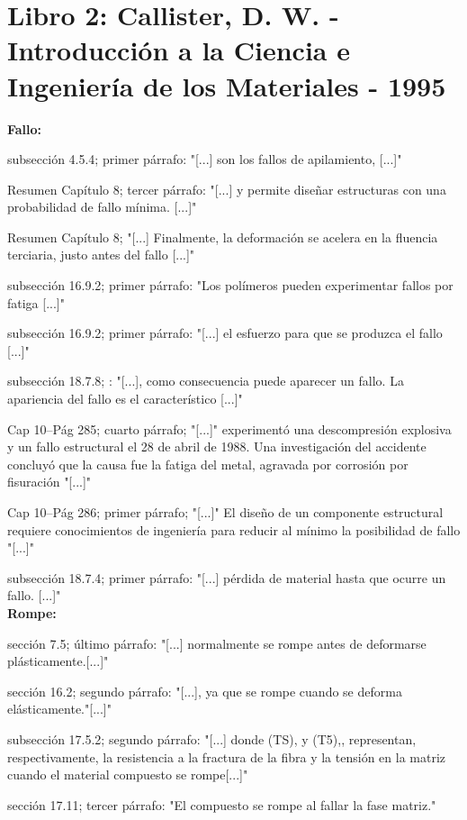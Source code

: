 \documentclass[12pt,a4paper]{article}
\begin{document}
    
\section{Libro 2: Callister, D. W. - Introducción a la Ciencia e Ingeniería de los Materiales - 1995}

\textbf{Fallo:} 

subsección 4.5.4; primer párrafo: "[...] son los fallos de apilamiento, [...]"
    
Resumen Capítulo 8; tercer párrafo: "[...] y permite diseñar estructuras con una probabilidad de fallo mínima. [...]"
    
Resumen Capítulo 8; "[...] Finalmente, la deformación se acelera en la fluencia terciaria, justo antes del fallo [...]"
    
subsección 16.9.2; primer párrafo: "Los polímeros pueden experimentar fallos por fatiga [...]"
    
subsección 16.9.2; primer párrafo: "[...] el esfuerzo para que se produzca el fallo [...]"

subsección 18.7.8; : "[...], como consecuencia puede aparecer un fallo. La apariencia del fallo es el característico [...]"

Cap 10–Pág 285; cuarto párrafo; "[...]" experimentó una descompresión explosiva y un fallo estructural el 28 de abril de 1988. Una investigación del accidente concluyó
que la causa fue la fatiga del metal, agravada por corrosión por fisuración "[...]"

Cap 10–Pág 286; primer párrafo; "[...]" El diseño de un componente estructural requiere conocimientos de ingeniería para reducir al mínimo la posibilidad de fallo "[...]"

    
subsección 18.7.4; primer párrafo: "[...] pérdida de material hasta que ocurre un fallo. [...]"\\[0.1cm]
    
\textbf{Rompe:}

sección 7.5; último párrafo: "[...] normalmente se rompe antes de deformarse plásticamente.[...]"
    
sección 16.2; segundo párrafo: "[...], ya que se rompe cuando se deforma elásticamente."[...]"
    
subsección 17.5.2; segundo párrafo: "[...] donde (TS), y (T5),, representan, respectivamente, la resistencia a la fractura de la fibra y la tensión en la matriz cuando el material compuesto se rompe[...]"
    
sección 17.11; tercer párrafo: "El compuesto se rompe al fallar la fase matriz."\\[0.1cm]
\end{document}
